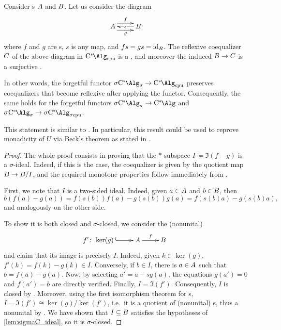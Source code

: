 \begin{lemma}\label{lem:reflexive_coeq}
	Consider \cstars{}s ${A}$ and ${B}$. Let us consider the diagram
	\[
		\xymatrix{
		\A
		\ar@<1.2ex>[r]^f
		\ar@<-1.2ex>[r]_g
		&
		\B
		\ar@{->}[l]|-{s}
		}
	\]
	where $f$ and $g$ are \starshom{}s, $s$ is any \cpu{} map, and $fs=gs=\operatorname{id}_{{B}}$. The reflexive coequalizer ${C}$ of the above diagram in $\Calgcpu$ is a \cstars{}, and moreover the induced ${B} \to {C}$ is a surjective \starshom{}.

	In other words, the forgetful functor $\SigmaC \to \Calgcpu$ preserves coequalizers that become reflexive after applying the functor.
	Consequently, the same holds for the forgetful functors $\SigmaC\to \Calg$ and $\SigmaC \to \SigmaCcpu$.
\end{lemma}
This statement is similar to \cite[Proposition 4.4]{furber2024monad}.
In particular, this result could be used to reprove monadicity of $U$ via Beck's theorem as stated in \cite[Theorem 3.14]{barr2005toposes}.

\begin{proof}
	The whole proof consists in proving that the $*$-subspace $I\coloneqq {\Im(f-g)}$ is a $\sigma$-ideal.
	Indeed, if this is the case, the coequalizer is given by the quotient map ${B} \to {B}/I$, and the required monotone properties follow immediately from \cite[Proposition 2.2.21]{saito15monotone}.

	First, we note that $I$ is a two-sided ideal.
	Indeed, given $a\in {A}$ and $b\in {B}$, then
	\[ b(f(a)-g(a)) = f(s(b)) f(a) - g(s(b)) g(a) = f(s(b)a)-g(s(b)a),\]
	and analogously on the other side.

	To show it is both closed and $\sigma$-closed, we consider the (nonunital) \starshom{}
	\[
		f'\colon
		\xymatrix{\ker(g)\, \ar@{^{(}->}[r] & \A \ar[r]^f& \B}
	\]
	and claim that its image is precisely $I$.
	Indeed, given $k \in \ker(g)$, $f'(k)=f(k)-g(k)\in I$.
	Conversely, if $b\in I$, there is $a\in {A}$ such that $b=f(a)-g(a)$.
	Now, by selecting $a'=a-sg(a)$, the equations $g(a')=0$ and $f(a')=b$ are directly verified.
	Finally, $I=\Im(f')$.
	Consequently, $I$ is closed by \cite[Theorem 3.1.6]{murphy90cstar}.
	Moreover, using the first isomorphism theorem for \cstar{}s, $I = {\Im(f')}\cong \ker(g)/\ker(f')$, i.e.~it is a quotient of (nonunital) \cstars{}s, thus a nonunital \cstars{} by \cite[Proposition 2.2.21]{saito15monotone}.
	We have shown that $I\subseteq {B}$ satisfies the hypotheses of \cref{lem:sigmaC_ideal}, so it is $\sigma$-closed.
\end{proof}

